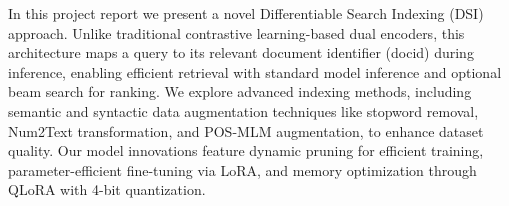 In this project report we present a novel Differentiable Search Indexing (DSI) approach. Unlike traditional contrastive learning-based dual encoders, this architecture maps a query to its relevant document identifier (docid) during inference, enabling efficient retrieval with standard model inference and optional beam search for ranking. We explore advanced indexing methods, including semantic and syntactic data augmentation techniques like stopword removal, Num2Text transformation, and POS-MLM augmentation, to enhance dataset quality. Our model innovations feature dynamic pruning for efficient training, parameter-efficient fine-tuning via LoRA, and memory optimization through QLoRA with 4-bit quantization.
